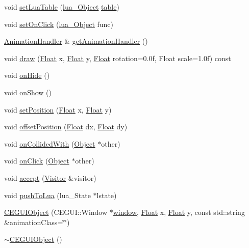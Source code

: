 \begin{DoxyCompactItemize}
\item 
void \hyperlink{classZeta_1_1CEGUIObject_a8236a240cba193bbef94d41c7a4298b0}{set\+Lua\+Table} (\hyperlink{ZetaConfig_8hpp_ae7be32b73848041a60f2412f72bbb221}{lua\+\_\+\+Object} \hyperlink{classZeta_1_1CEGUIObject_aea2af13d5b10dcf739073d39b3aaf206}{table})
\item 
void \hyperlink{classZeta_1_1CEGUIObject_a290ed8ce06dc21739956cb69788518a7}{set\+On\+Click} (\hyperlink{ZetaConfig_8hpp_ae7be32b73848041a60f2412f72bbb221}{lua\+\_\+\+Object} func)
\item 
\hyperlink{classZeta_1_1AnimationHandler}{Animation\+Handler} \& \hyperlink{classZeta_1_1CEGUIObject_ae54b4916e8a11ca818f8fe9580c8944d}{get\+Animation\+Handler} ()
\item 
void \hyperlink{classZeta_1_1CEGUIObject_a7faadfc88dae840a884513af9f84bca5}{draw} (\hyperlink{namespaceZeta_a1e0a1265f9b3bd3075fb0fabd39088ba}{Float} x, \hyperlink{namespaceZeta_a1e0a1265f9b3bd3075fb0fabd39088ba}{Float} y, \hyperlink{namespaceZeta_a1e0a1265f9b3bd3075fb0fabd39088ba}{Float} rotation=0.\+0f, Float scale=1.\+0f) const 
\item 
void \hyperlink{classZeta_1_1CEGUIObject_a49403556509b9a9d13e5456598dedd8e}{on\+Hide} ()
\item 
void \hyperlink{classZeta_1_1CEGUIObject_af3ce50d6c46154c514aaba792da27b2e}{on\+Show} ()
\item 
void \hyperlink{classZeta_1_1CEGUIObject_afe2218ea6474ad5bcec573fb5cfad0c9}{set\+Position} (\hyperlink{namespaceZeta_a1e0a1265f9b3bd3075fb0fabd39088ba}{Float} x, \hyperlink{namespaceZeta_a1e0a1265f9b3bd3075fb0fabd39088ba}{Float} y)
\item 
void \hyperlink{classZeta_1_1CEGUIObject_acade0bc722e9086f2b3ee3f7fbb72720}{offset\+Position} (\hyperlink{namespaceZeta_a1e0a1265f9b3bd3075fb0fabd39088ba}{Float} dx, \hyperlink{namespaceZeta_a1e0a1265f9b3bd3075fb0fabd39088ba}{Float} dy)
\item 
void \hyperlink{classZeta_1_1CEGUIObject_a14e7fd93199aac07ddbcec0cfcd7193d}{on\+Collided\+With} (\hyperlink{classZeta_1_1Object}{Object} $\ast$other)
\item 
void \hyperlink{classZeta_1_1CEGUIObject_a7c80da617f44c0077604bed6025e71b1}{on\+Click} (\hyperlink{classZeta_1_1Object}{Object} $\ast$other)
\item 
void \hyperlink{classZeta_1_1CEGUIObject_a6f0b26fbbe0c824ca01b54783dbd3b75}{accept} (\hyperlink{classZeta_1_1Visitor}{Visitor} \&visitor)
\item 
void \hyperlink{classZeta_1_1CEGUIObject_a2a5f91ecdd89433dca6f394006407c09}{push\+To\+Lua} (lua\+\_\+\+State $\ast$lstate)
\item 
\hyperlink{classZeta_1_1CEGUIObject_aeb3c48229a3112dfde99135aa0619f8b}{C\+E\+G\+U\+I\+Object} (C\+E\+G\+U\+I\+::\+Window $\ast$\hyperlink{classZeta_1_1CEGUIObject_a3dcaa63869fa949e36cc765143571963}{window}, \hyperlink{namespaceZeta_a1e0a1265f9b3bd3075fb0fabd39088ba}{Float} x, \hyperlink{namespaceZeta_a1e0a1265f9b3bd3075fb0fabd39088ba}{Float} y, const std\+::string \&animation\+Class=\char`\"{}\char`\"{})
\item 
\hyperlink{classZeta_1_1CEGUIObject_ac461f59488cc5bf4b831487213317070}{$\sim$\+C\+E\+G\+U\+I\+Object} ()
\end{DoxyCompactItemize}
